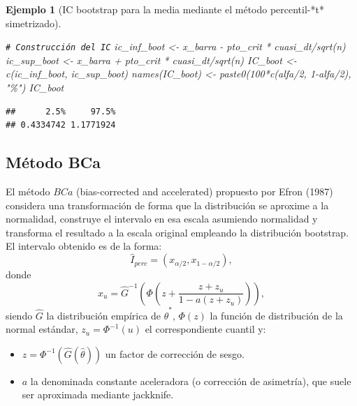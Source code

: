 \documentclass[
]{book}
\newenvironment{Shaded}{\begin{snugshade}}{\end{snugshade}}
\newcommand{\CommentTok}[1]{\textcolor[rgb]{0.56,0.35,0.01}{\textit{#1}}}
\newcommand{\DecValTok}[1]{\textcolor[rgb]{0.00,0.00,0.81}{#1}}
\newcommand{\FunctionTok}[1]{\textcolor[rgb]{0.00,0.00,0.00}{#1}}
\newcommand{\NormalTok}[1]{#1}
\newcommand{\OtherTok}[1]{\textcolor[rgb]{0.56,0.35,0.01}{#1}}
\newcommand{\SpecialCharTok}[1]{\textcolor[rgb]{0.00,0.00,0.00}{#1}}
\newcommand{\StringTok}[1]{\textcolor[rgb]{0.31,0.60,0.02}{#1}}
\providecommand{\tightlist}{%
  \setlength{\itemsep}{0pt}\setlength{\parskip}{0pt}}
\theoremstyle{break}
\newtheorem{example}{Ejemplo}[chapter]
\theoremstyle{nonumberplain}
\renewcommand{\CommentTok}[1]{\textcolor[rgb]{0.41,0.41,0.41}{\texttt{#1}}}
\begin{document}
\begin{example}[IC bootstrap para la media mediante el método percentil-*t* simetrizado]
\begin{Shaded}
\begin{Highlighting}[]
\CommentTok{\# Construcción del IC}
\NormalTok{ic\_inf\_boot }\OtherTok{\textless{}{-}}\NormalTok{ x\_barra }\SpecialCharTok{{-}}\NormalTok{ pto\_crit }\SpecialCharTok{*}\NormalTok{ cuasi\_dt}\SpecialCharTok{/}\FunctionTok{sqrt}\NormalTok{(n)}
\NormalTok{ic\_sup\_boot }\OtherTok{\textless{}{-}}\NormalTok{ x\_barra }\SpecialCharTok{+}\NormalTok{ pto\_crit }\SpecialCharTok{*}\NormalTok{ cuasi\_dt}\SpecialCharTok{/}\FunctionTok{sqrt}\NormalTok{(n)}
\NormalTok{IC\_boot }\OtherTok{\textless{}{-}} \FunctionTok{c}\NormalTok{(ic\_inf\_boot, ic\_sup\_boot)}
\FunctionTok{names}\NormalTok{(IC\_boot) }\OtherTok{\textless{}{-}} \FunctionTok{paste0}\NormalTok{(}\DecValTok{100}\SpecialCharTok{*}\FunctionTok{c}\NormalTok{(alfa}\SpecialCharTok{/}\DecValTok{2}\NormalTok{, }\DecValTok{1}\SpecialCharTok{{-}}\NormalTok{alfa}\SpecialCharTok{/}\DecValTok{2}\NormalTok{), }\StringTok{"\%"}\NormalTok{)}
\NormalTok{IC\_boot}
\end{Highlighting}
\end{Shaded}

\begin{verbatim}
##      2.5%     97.5% 
## 0.4334742 1.1771924
\end{verbatim}

\end{example}

\hypertarget{boot-ic-bca}{%
\subsection{Método BCa}\label{boot-ic-bca}}

El método \(BCa\) (bias-corrected and accelerated) propuesto por Efron (1987) considera una transformación de forma que la distribución se aproxime a la normalidad, construye el intervalo en esa escala asumiendo normalidad y transforma el resultado a la escala original empleando la distribución bootstrap.
El intervalo obtenido es de la forma:
\[\hat{I}_{perc}=\left( x_{\alpha /2}, x_{1-\alpha /2}  \right),\]
donde\\
\[x_u = \hat G^{-1}\left(\Phi\left(z + \frac{z + z_u}{1-a(z+z_u)}\right)  \right),\]
siendo \(\hat G\) la distribución empírica de \(\hat{\theta}^{\ast}\), \(\Phi(z)\) la función de distribución de la normal estándar, \(z_u = \Phi^{-1}(u)\) el correspondiente cuantil y:

\begin{itemize}
\tightlist
\item
  \(z = \Phi^{-1}(\hat G(\hat\theta))\) un factor de corrección de sesgo.
\item
  \(a\) la denominada constante aceleradora (o corrección de asimetría), que suele ser aproximada mediante jackknife.
\end{itemize}
\end{document}
